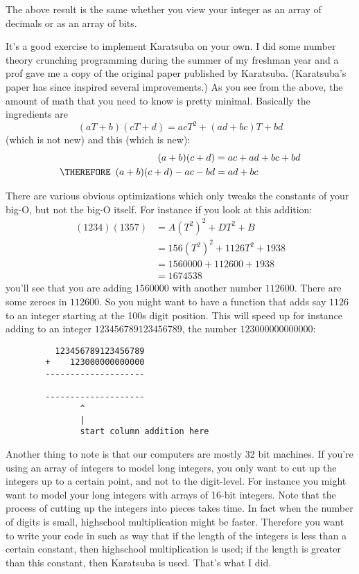 The above result is the same whether you view your integer as an array
of decimals or as an array of bits.

It's a good exercise to implement Karatsuba on your own.
I did some number theory crunching programming during the
summer of my freshman
year and a prof gave me a copy of the original 
paper published by Karatsuba.
(Karatsuba's paper has since inspired several improvements.)
As you see from the above, the amount of math that you need to know
is pretty minimal.
Basically the ingredients are
\[
(aT + b)(cT + d) = acT^2 + (ad + bc)T + bd
\]
(which is not new) and this (which is new):
\begin{align*}
(a+b)(c+d) &= ac + ad + bc + bd \\
\THEREFORE \,\,\, (a+b)(c+d) - ac - bd &= ad + bc
\end{align*}

There are various obvious optimizations which only tweaks the
constants of your big-O, but not the big-O itself. 
For instance if you look at this addition:
\begin{align*}
(1234)(1357)  
&= A(T^2)^2 + D T^2 + B \\
&= 156(T^2)^2 + 1126 T^2 + 1938 \\
&= 1560000 + 112600 + 1938 \\
&= 1674538
\end{align*}
you'll see that you are adding $1560000$ with another number $112600$.
There are some zeroes in $112600$.
So you might want to have a function that adds say $1126$ to an integer
starting at the 100s digit position.
This will speed up for instance adding to an integer $123456789123456789$, 
the number
$123000000000000$:
\begin{Verbatim}
          123456789123456789
        +    123000000000000
        --------------------

        --------------------
               ^
               |
               start column addition here
\end{Verbatim}

Another thing to note is that our computers are mostly 32 bit machines.
If you're using an array of integers to model long integers,
you only want to cut up the integers up to a certain point, and not
to the digit-level.
For instance you might want to model your long integers
with arrays of 16-bit integers.
Note that the process of cutting up the integers into pieces
takes time.
In fact when the number of digits is small, highschool multiplication
might be faster.
Therefore you want to write your code in such as way that 
if the length of the integers is less than a certain constant,
then highschool multiplication is used;
if the length is greater than this constant, then Karatsuba is used.
That's what I did.

